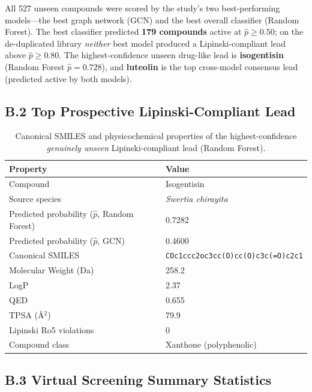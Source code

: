 All 527 unseen compounds were scored by the study's two best-performing models---the
best graph network (GCN) and the best overall classifier (Random Forest). The best
classifier predicted \textbf{179 compounds} active at $\hat{p} \geq 0.50$; on the
de-duplicated library \emph{neither} best model produced a Lipinski-compliant lead
above $\hat{p} \geq 0.80$. The highest-confidence unseen drug-like lead is
\textbf{isogentisin} (Random Forest $\hat{p} = 0.728$), and \textbf{luteolin} is the
top cross-model consensus lead (predicted active by both models).

\subsection*{B.2 Top Prospective Lipinski-Compliant Lead}

\begin{table}[H]
\caption{Canonical SMILES and physicochemical properties of the highest-confidence
         \emph{genuinely unseen} Lipinski-compliant lead (Random Forest).}
\label{tab:app_smiles}
\centering
\small
\begin{tabular}{@{}p{3.5cm}p{9.8cm}@{}}
\toprule
\textbf{Property} & \textbf{Value} \\
\midrule
Compound
  & Isogentisin \\
Source species
  & \textit{Swertia chirayita} \\
Predicted probability ($\hat{p}$, Random Forest)
  & 0.7282 \\
Predicted probability ($\hat{p}$, GCN)
  & 0.4600 \\
Canonical SMILES
  & \texttt{COc1ccc2oc3cc(O)cc(O)c3c(=O)c2c1} \\
Molecular Weight (Da)
  & 258.2 \\
LogP
  & 2.37 \\
QED
  & 0.655 \\
TPSA (\AA$^2$)
  & 79.9 \\
Lipinski Ro5 violations
  & 0 \\
Compound class
  & Xanthone (polyphenolic) \\
\bottomrule
\end{tabular}
\end{table}

\subsection*{B.3 Virtual Screening Summary Statistics}


